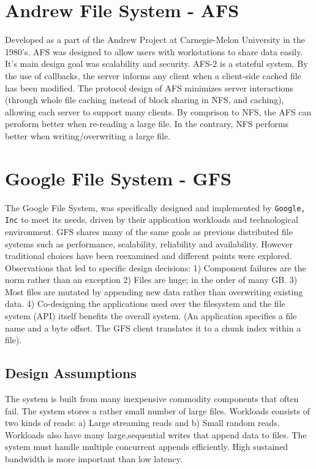 \documentclass[letterpaper,twocolumn,10pt]{article}
\begin{document}
\section{Andrew File System - AFS}
Developed as a part of the Andrew Project at Carnegie-Melon University in the 1980's. AFS was designed to allow users with workstations to share data easily. It's main design goal was scalability and security. 
AFS-2 is a stateful system. By the use of callbacks, the server informs any client when a client-side cached file has been modified. 
The protocol design of AFS minimizes server interactions (through whole file caching instead of block sharing in NFS, and caching), allowing each server to support many clients. By comprison to NFS, the AFS can peroform better when re-reading a large file. In the contrary, NFS performs better when writing/overwriting a large file.

\section{Google File System - GFS}
The Google File System, was specifically designed and implemented by {\tt Google, Inc} to meet its needs, driven by their application workloads and technological environment.
GFS shares many of the same goals as previous distributed file systems such as performance, scalability, reliability and availability. However traditional choices have been reexamined and different points were explored.
Observations that led to specific design decisions:
1) Component failures are the norm rather than an exception
2) Files are huge; in the order of many GB.
3) Most files are mutated by appending new data rather than overwriting existing data.
4) Co-designing the applications used over the filesystem and the file system (API) itself benefits the overall system. (An application specifies a file name and a byte offset. The GFS client translates it to a chunk index within a file).

\subsection{Design Assumptions}
The system is built from many inexpensive commodity components that often fail.
The system stores a rather small number of large files.
Workloads consists of two kinds of reads: a) Large streaming reads and b) Small random reads.
Workloads also have many large,sequential writes that append data to files.
The system must handle multiple concurrent appends efficiently.
High sustained bandwidth is more important than low latency.
\end{document}
